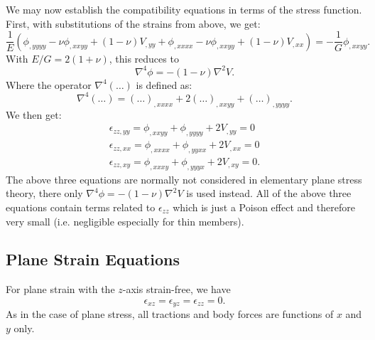 We may now establish the compatibility equations in terms of the stress function.
First, with substitutions of the strains from above, we get:
\begin{equation*}
  \frac{1}{E} \left( \phi_{,yyyy} - \nu \phi_{,x xyy} + \left( 1 - \nu \right) V_{,yy} + \phi_{,x x x x} - \nu \phi_{, x x y y} + \left( 1 - \nu \right) V_{, x x}  \right) = - \frac{1}{G} \phi_{,x x yy}
.\end{equation*}
With $E / G = 2 \left( 1 + \nu \right)$, this reduces to
\begin{equation*}
  \nabla^{4} \phi = - \left( 1 - \nu \right) \nabla^2 V
.\end{equation*}
Where the operator $\nabla^{4}(\ldots )$ is defined as:
\begin{equation*}
  \nabla^{4} \left( \ldots  \right) = \left( \ldots  \right)_{, x x x x} + 2 \left( \ldots  \right)_{, x x yy} + \left( \ldots \right)_{,yyyy} 
.\end{equation*}
We then get:
\begin{gather*}
  \epsilon_{zz, yy} = \phi_{,x x yy} + \phi_{,yyyy} + 2V_{,yy} = 0 \\
  \epsilon_{zz, x x} = \phi_{, x x x x} + \phi_{, yyx x} + 2V_{, x x} = 0 \\
  \epsilon_{zz, xy} = \phi_{, x x xy} + \phi_{, yyyx} + 2V_{,xy} = 0
.\end{gather*}
The above three equations are normally not considered in elementary plane stress theory, there only $\nabla^{4}\phi = - \left( 1 - \nu \right) \nabla^2 V$ is used instead.
All of the above three equations contain terms related to $\epsilon_{zz}$ which is just a Poison effect and therefore very small (i.e. negligible especially for thin members).

\subsection{Plane Strain Equations}
For plane strain with the $z$-axis strain-free, we have
\begin{equation*}
  \epsilon_{xz} = \epsilon_{yz} = \epsilon_{zz} = 0
.\end{equation*}
As in the case of plane stress, all tractions and body forces are functions of $x$ and $y$ only.

